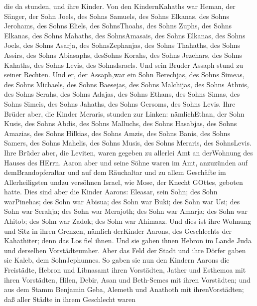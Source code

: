 die da stunden, und ihre Kinder. Von den KindernKahaths war Heman, der
Sänger, der Sohn Joels, des Sohns Samuels,  des Sohns
Elkanas, des Sohns Jerohams, des Sohns Eliels, des SohnsThoahs,
 des Sohns Zuphs, des Sohns Elkanas, des Sohns Mahaths, des
SohnsAmasais,  des Sohns Elkanas, des Sohns Joels, des
Sohns Asarja, des SohnsZephanjas,  des Sohns Thahaths, des
Sohns Assirs, des Sohns Abiasaphs, desSohns Korahs,  des
Sohns Jezehars, des Sohns Kahaths, des Sohns Levis, des SohnsIsraels.
 Und sein Bruder Assaph stund zu seiner Rechten. Und er,
der Assaph,war ein Sohn Berechjas, des Sohns Simeas,  des
Sohns Michaels, des Sohns Baesejas, des Sohns Malchijas, 
des Sohns Athnis, des Sohns Serahs, des Sohns Adajas,  des
Sohns Ethans, des Sohns Simas, des Sohns Simeis,  des Sohns
Jahaths, des Sohns Gersoms, des Sohns Levis.  Ihre Brüder
aber, die Kinder Meraris, stunden zur Linken: nämlichEthan, der Sohn
Kusis, des Sohns Abdis, des Sohns Malluchs,  des Sohns
Hasabjas, des Sohns Amazias, des Sohns Hilkias,  des Sohns
Amzis, des Sohns Banis, des Sohns Samers,  des Sohns
Mahelis, des Sohns Musis, des Sohns Meraris, des SohnsLevis.
 Ihre Brüder aber, die Leviten, waren gegeben zu allerlei
Amt an derWohnung des Hauses des HErrn.  Aaron aber und
seine Söhne waren im Amt, anzuzünden auf demBrandopferaltar und auf dem
Räuchaltar und zu allem Geschäfte im Allerheiligsten undzu versöhnen
Israel, wie Mose, der Knecht GOttes, geboten hatte.  Dies
sind aber die Kinder Aarons: Eleasar, sein Sohn; des Sohn warPinehas;
des Sohn war Abisua;  des Sohn war Buki; des Sohn war Usi;
des Sohn war Serahja;  des Sohn war Merajoth; des Sohn war
Amarja; des Sohn war Ahitob;  des Sohn war Zadok; des Sohn
war Ahimaaz.  Und dies ist ihre Wohnung und Sitz in ihren
Grenzen, nämlich derKinder Aarons, des Geschlechts der Kahathiter; denn
das Los fiel ihnen.  Und sie gaben ihnen Hebron im Lande
Juda und derselben Vorstädteumher.  Aber das Feld der Stadt
und ihre Dörfer gaben sie Kaleb, dem SohnJephunnes.  So
gaben sie nun den Kindern Aarons die Freistädte, Hebron und Libnasamt
ihren Vorstädten, Jather und Esthemoa mit ihren Vorstädten,
 Hilen, Debir,  Asan und Beth-Semes mit ihren
Vorstädten;  und aus dem Stamm Benjamin Geba, Alemeth und
Anathoth mit ihrenVorstädten; daß aller Städte in ihrem Geschlecht waren

